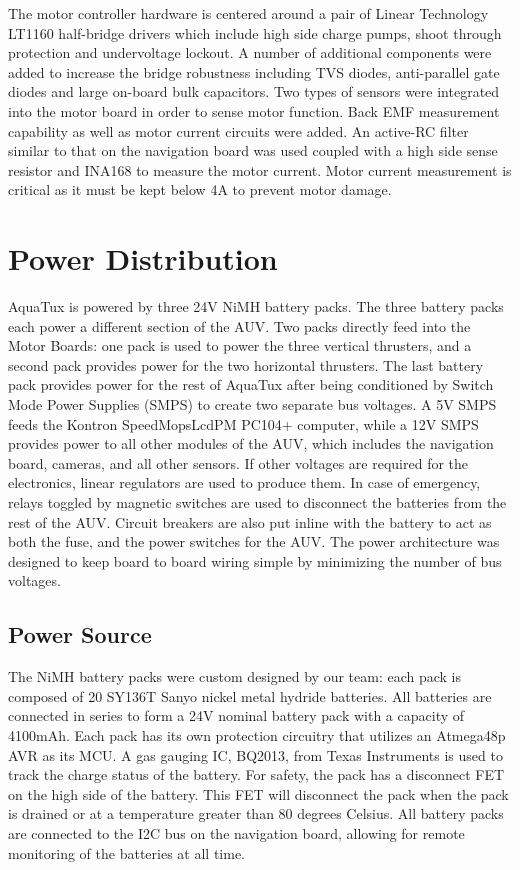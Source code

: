 The motor controller hardware is centered around a pair of Linear
Technology LT1160 half-bridge drivers which include high side charge
pumps, shoot through protection and undervoltage lockout. A number of
additional components were added to increase the bridge robustness
including TVS diodes, anti-parallel gate diodes and large on-board
bulk capacitors. Two types of sensors were integrated into the motor
board in order to sense motor function. Back EMF measurement
capability as well as motor current circuits were added. An active-RC
filter similar to that on the navigation board was used coupled with a
high side sense resistor and INA168 to measure the motor current.
Motor current measurement is critical as it must be kept below 4A to
prevent motor damage.

\section{Power Distribution}
AquaTux is powered by three 24V NiMH battery packs.  The three battery
packs each power a different section of the AUV.  Two packs directly
feed into the Motor Boards: one pack is used to power the three
vertical thrusters, and a second pack provides power for the two
horizontal thrusters.  The last battery pack provides power for the
rest of AquaTux after being conditioned by Switch Mode Power Supplies
(SMPS) to create two separate bus voltages. A 5V SMPS feeds the
Kontron SpeedMopsLcdPM PC104+ computer, while a 12V SMPS provides power to
all other modules of the AUV, which includes the navigation board,
cameras, and all other sensors. If other voltages are required for the
electronics, linear regulators are used to produce them.  In case of
emergency, relays toggled by magnetic switches are used to disconnect
the batteries from the rest of the AUV. Circuit breakers are also put
inline with the battery to act as both the fuse, and the power
switches for the AUV. The power architecture was designed to keep
board to board wiring simple by minimizing the number of bus voltages.

\subsection{Power Source}
The NiMH battery packs were custom designed by our team: each pack is
composed of 20 SY136T Sanyo nickel metal hydride batteries.  All
batteries are connected in series to form a 24V nominal battery pack
with a capacity of 4100mAh.  Each pack has its own protection
circuitry that utilizes an Atmega48p AVR as its MCU.  A gas gauging IC, BQ2013,
from Texas Instruments is used to track the charge status of the
battery. %
For safety, the pack has a disconnect FET on the high side of the
battery.  This FET will disconnect the pack when the pack is drained
or at a temperature greater than 80 degrees Celsius. All battery packs
are connected to the I2C bus on the navigation board, allowing for
remote monitoring of the batteries at all time.

